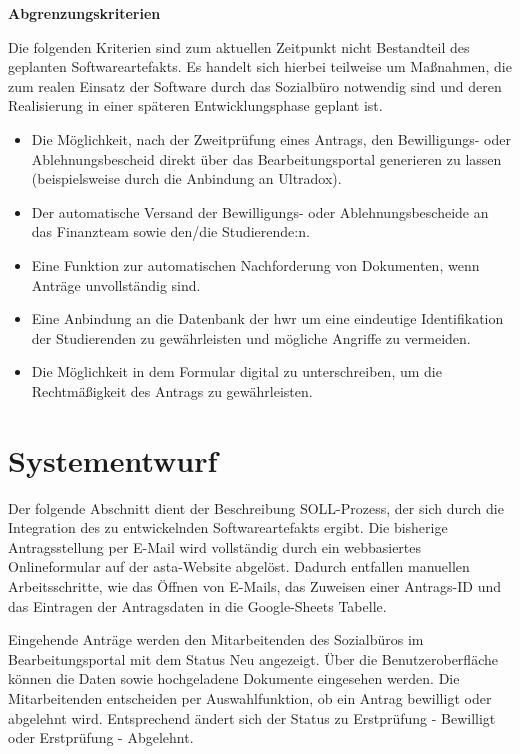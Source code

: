 \textbf{Abgrenzungskriterien}

Die folgenden Kriterien sind zum aktuellen Zeitpunkt nicht Bestandteil des geplanten Softwareartefakts. Es handelt sich hierbei teilweise um Maßnahmen, die zum realen Einsatz der Software durch das Sozialbüro notwendig sind und deren Realisierung in einer späteren Entwicklungsphase geplant ist. 
\begin{itemize} 
    \item Die Möglichkeit, nach der Zweitprüfung eines Antrags, den Bewilligungs- oder Ablehnungsbescheid  direkt über das Bearbeitungsportal generieren zu lassen (beispielsweise durch die Anbindung an Ultradox). 
    \item Der automatische Versand der Bewilligungs- oder Ablehnungsbescheide an das Finanzteam sowie den/die Studierende:n. 
    \item Eine Funktion zur automatischen Nachforderung von Dokumenten, wenn Anträge unvollständig sind. 
    \item Eine Anbindung an die Datenbank der \gls{hwr} um eine eindeutige Identifikation der Studierenden zu gewährleisten und mögliche Angriffe zu vermeiden. 
    \item Die Möglichkeit in dem Formular digital zu unterschreiben, um die Rechtmäßigkeit des Antrags zu gewährleisten. 
\end{itemize}



\section{Systementwurf}\label{sec:Systementwurf}
Der folgende Abschnitt dient der Beschreibung SOLL-Prozess, der sich durch die Integration des zu entwickelnden Softwareartefakts ergibt. 
Die bisherige Antragsstellung per E-Mail wird vollständig durch ein webbasiertes Onlineformular auf der \gls{asta}-Website abgelöst. Dadurch entfallen manuellen Arbeitsschritte, wie das Öffnen von E-Mails, das Zuweisen einer Antrags-ID und das Eintragen der Antragsdaten in die Google-Sheets Tabelle. 

Eingehende Anträge werden den Mitarbeitenden des Sozialbüros im Bearbeitungsportal mit dem Status \glqq{}Neu\grqq{} angezeigt. Über die Benutzeroberfläche können die Daten sowie hochgeladene Dokumente eingesehen werden. Die Mitarbeitenden entscheiden per Auswahlfunktion, ob ein Antrag bewilligt oder abgelehnt wird. Entsprechend ändert sich der Status zu \glqq{}Erstprüfung - Bewilligt\grqq{} oder \glqq{}Erstprüfung - Abgelehnt\grqq{}. 

